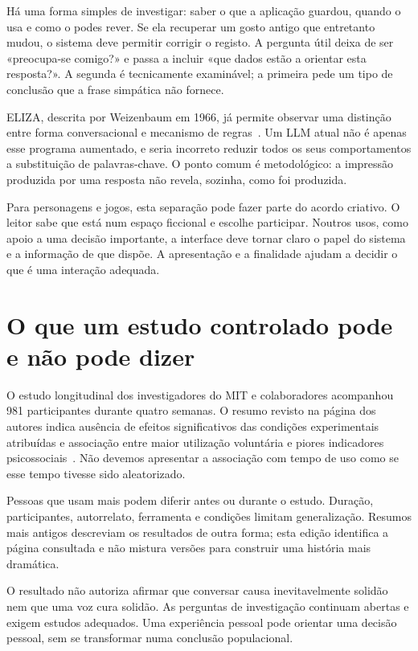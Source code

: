 Há uma forma simples de investigar: saber o que a aplicação guardou, quando o usa e como o podes rever. Se ela recuperar um gosto antigo que entretanto mudou, o sistema deve permitir corrigir o registo. A pergunta útil deixa de ser «preocupa-se comigo?» e passa a incluir «que dados estão a orientar esta resposta?». A segunda é tecnicamente examinável; a primeira pede um tipo de conclusão que a frase simpática não fornece.

ELIZA, descrita por Weizenbaum em 1966, já permite observar uma distinção entre forma conversacional e mecanismo de regras~\citep{weizenbaum1966}. Um LLM atual não é apenas esse programa aumentado, e seria incorreto reduzir todos os seus comportamentos a substituição de palavras-chave. O ponto comum é metodológico: a impressão produzida por uma resposta não revela, sozinha, como foi produzida.

Para personagens e jogos, esta separação pode fazer parte do acordo criativo. O leitor sabe que está num espaço ficcional e escolhe participar. Noutros usos, como apoio a uma decisão importante, a interface deve tornar claro o papel do sistema e a informação de que dispõe. A apresentação e a finalidade ajudam a decidir o que é uma interação adequada.

\section{O que um estudo controlado pode e não pode dizer}
O estudo longitudinal dos investigadores do MIT e colaboradores acompanhou 981 participantes durante quatro semanas. O resumo revisto na página dos autores indica ausência de efeitos significativos das condições experimentais atribuídas e associação entre maior utilização voluntária e piores indicadores psicossociais~\citep{fang2025}. Não devemos apresentar a associação com tempo de uso como se esse tempo tivesse sido aleatorizado.

Pessoas que usam mais podem diferir antes ou durante o estudo. Duração, participantes, autorrelato, ferramenta e condições limitam generalização. Resumos mais antigos descreviam os resultados de outra forma; esta edição identifica a página consultada e não mistura versões para construir uma história mais dramática.

O resultado não autoriza afirmar que conversar causa inevitavelmente solidão nem que uma voz cura solidão. As perguntas de investigação continuam abertas e exigem estudos adequados. Uma experiência pessoal pode orientar uma decisão pessoal, sem se transformar numa conclusão populacional.

